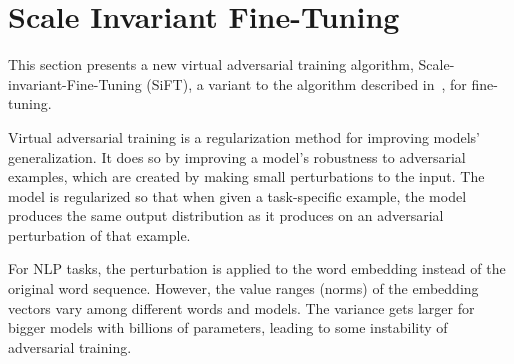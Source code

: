 

\section{Scale Invariant Fine-Tuning}

This section presents a new virtual adversarial training algorithm, Scale-invariant-Fine-Tuning (SiFT), a variant to the algorithm described in~\cite{miyato2018vat,jiang2019smart}, for fine-tuning. 

Virtual adversarial training is a regularization method for improving models’ generalization. It does so by improving a model’s robustness to adversarial examples, which are created by making small perturbations to the input. The model is regularized so that when given a task-specific example, the model produces the same output distribution as it produces on an adversarial perturbation of that example. 

For NLP tasks, the perturbation is applied to the word embedding instead of the original word sequence. However, the value ranges (norms) of the embedding vectors vary among different words and models. The variance gets larger for bigger models with billions of parameters, leading to some instability of adversarial training. 


